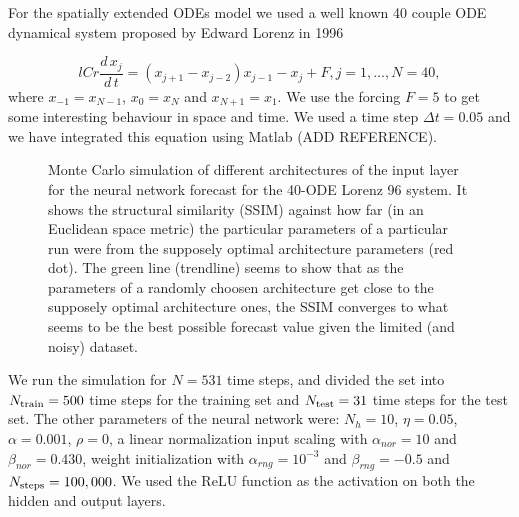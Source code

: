 \documentclass[journal]{IEEEtran}
\begin{document}
For the spatially extended ODEs model we used a well known 40 couple ODE dynamical system proposed by Edward Lorenz in 1996 \cite{articleLorenz96}

\begin{equation}{lCr}
\label{lorenz96equations}
\frac{d\,x_j}{d\,t}=\left( x_{j+1} - x_{j-2} \right ) x_{j-1} - x_j + F, j=1, \ldots, N=40,
\end{equation}
where $x_{-1}=x_{N-1}$, $x_0=x_N$ and $x_{N+1}=x_1$. We use the forcing $F=5$ to get some interesting behaviour in space and time. We used a time step $\Delta t=0.05$ and we have integrated this equation using Matlab (ADD REFERENCE).

\begin{figure}[!ht]
\centering
{}
\caption{Monte Carlo simulation of different architectures of the input layer for the neural network forecast for the 40-ODE Lorenz 96 system.
It shows the structural similarity (SSIM) against how far (in an Euclidean space metric) the particular parameters of a particular
run were from the supposely optimal architecture parameters (red dot). The green line (trendline) seems to show that as the parameters
of a randomly choosen architecture get close to the supposely optimal architecture ones, the SSIM converges to what seems to be the
best possible forecast value given the limited (and noisy) dataset.}
\label{MonteCarloSSIMversusParameterMetricDistanceLorenz96}
\end{figure}

We run the simulation for $N=531$ time steps, and divided the set into $N_{\textnormal{train}}=500$ time steps for the training set
and $N_{\textnormal{test}}=31$ time steps for the test set. The other parameters of the neural network were:
$N_h=10$, $\eta=0.05$, $\alpha=0.001$, $\rho=0$, a linear normalization input scaling with $\alpha_{nor} = 10$ and $\beta_{nor} = 0.430$, weight initialization with $\alpha_{rng} = 10^{-3}$ and $\beta_{rng} = -0.5$ and $N_{\textnormal{steps}}=100,000$. We used the ReLU function as the activation on both the hidden and output layers.
\end{document}
